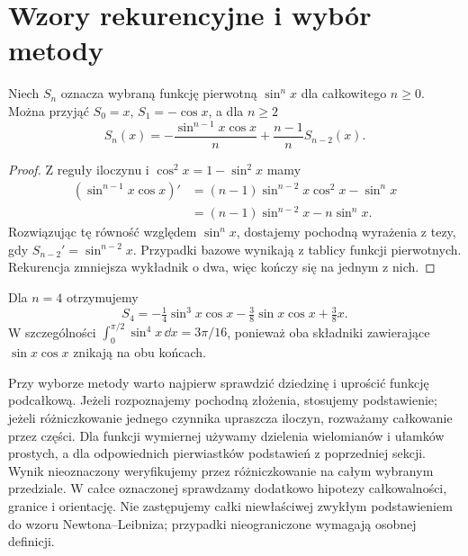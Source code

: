 \section{Wzory rekurencyjne i wybór metody}
\begin{twierdzenie}
\label{ma1:thm:sine-reduction}
Niech $S_n$ oznacza wybraną funkcję pierwotną $\sin^n x$ dla całkowitego $n\ge0$. Można przyjąć $S_0=x$, $S_1=-\cos x$, a dla $n\ge2$
\[
 S_n(x)=-\frac{\sin^{n-1}x\cos x}{n}+\frac{n-1}{n}S_{n-2}(x).
\]
\end{twierdzenie}
\begin{proof}
Z reguły iloczynu i $\cos^2x=1-\sin^2x$ mamy
\[
 \begin{split}
 (\sin^{n-1}x\cos x)'
 &=(n-1)\sin^{n-2}x\cos^2x-\sin^nx\\
 &=(n-1)\sin^{n-2}x-n\sin^nx.
 \end{split}
\]
Rozwiązując tę równość względem $\sin^nx$, dostajemy pochodną wyrażenia z tezy, gdy $S_{n-2}'=\sin^{n-2}x$. Przypadki bazowe wynikają z tablicy funkcji pierwotnych. Rekurencja zmniejsza wykładnik o dwa, więc kończy się na jednym z nich.
\end{proof}
Dla $n=4$ otrzymujemy
\[
 S_4=-\tfrac14\sin^3x\cos x-\tfrac38\sin x\cos x+\tfrac38 x.
\]
W szczególności $\int_0^{\pi/2}\sin^4x\,\dd x=3\pi/16$, ponieważ oba składniki zawierające $\sin x\cos x$ znikają na obu końcach.

Przy wyborze metody warto najpierw sprawdzić dziedzinę i uprościć funkcję podcałkową. Jeżeli rozpoznajemy pochodną złożenia, stosujemy podstawienie; jeżeli różniczkowanie jednego czynnika upraszcza iloczyn, rozważamy całkowanie przez części. Dla funkcji wymiernej używamy dzielenia wielomianów i ułamków prostych, a dla odpowiednich pierwiastków podstawień z poprzedniej sekcji. Wynik nieoznaczony weryfikujemy przez różniczkowanie na całym wybranym przedziale. W całce oznaczonej sprawdzamy dodatkowo hipotezy całkowalności, granice i orientację. Nie zastępujemy całki niewłaściwej zwykłym podstawieniem do wzoru Newtona--Leibniza; przypadki nieograniczone wymagają osobnej definicji.

